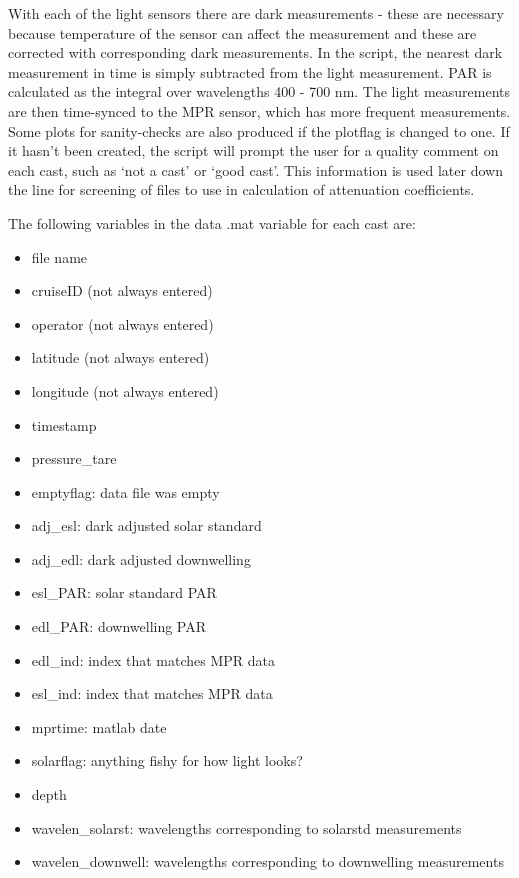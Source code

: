 \documentclass[11pt]{article}
\begin{document}
With each of the light sensors there are dark measurements - these are necessary because temperature of the sensor can affect the measurement and these are corrected with corresponding dark measurements. In the  script, the nearest dark measurement in time is simply subtracted from the light measurement. PAR is calculated as the integral over wavelengths 400 - 700 nm. The light measurements are then time-synced to the MPR sensor, which has more frequent measurements. Some plots for sanity-checks are also produced if the plotflag is changed to one. If it hasn't been created, the script will prompt the user for a quality comment on each cast, such as `not a cast' or `good cast'. This information is used later down the line for screening of files to use in calculation of attenuation coefficients.

The following variables in the data .mat variable for each cast are:

\begin{itemize}
\item file name
\item  cruiseID (not always entered)
\item operator  (not always entered)
\item latitude (not always entered) 
\item   longitude (not always entered)
\item    timestamp 
\item    pressure\_tare 
\item    emptyflag: data file was empty 
\item    adj\_esl: dark adjusted solar standard
\item    adj\_edl: dark adjusted downwelling
\item    esl\_PAR: solar standard PAR
\item    edl\_PAR: downwelling PAR
\item    edl\_ind: index that matches MPR data
\item    esl\_ind: index that matches MPR data
\item    mprtime: matlab date
\item    solarflag: anything fishy for how light looks?
\item    depth
\item wavelen\_solarst: wavelengths corresponding to solarstd measurements
\item wavelen\_downwell: wavelengths corresponding to downwelling measurements
\end{itemize}
\end{document}
